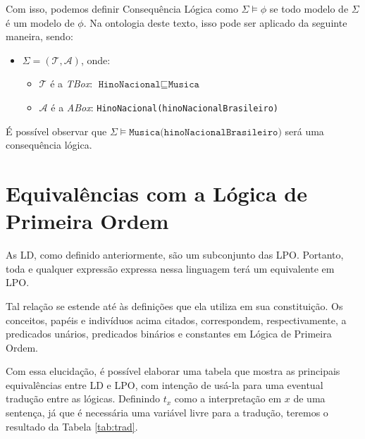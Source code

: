 Com isso, podemos definir Consequência Lógica como $ \Sigma \models \phi $ se todo modelo de $ \Sigma $ é um modelo de $ \phi $. Na ontologia deste texto, isso pode ser aplicado da seguinte maneira, sendo:

\begin{itemize}
	\item $ \Sigma = (\mathcal{T}, \mathcal{A}) $, onde:
	\begin{itemize}
		\item $ \mathcal{T} $ é a \textit{TBox}: $ \texttt{HinoNacional} \sqsubseteq \texttt{Musica} $
		\item $ \mathcal{A} $ é a \textit{ABox}: \texttt{HinoNacional(hinoNacionalBrasileiro)}
	\end{itemize}
\end{itemize}

É possível observar que $ \Sigma \models \texttt{Musica(hinoNacionalBrasileiro)} $ será uma consequência lógica.

\section{Equivalências com a Lógica de Primeira Ordem}

As LD, como definido anteriormente, são um subconjunto das LPO. Portanto, toda e qualquer expressão expressa nessa linguagem terá um equivalente em LPO. 

Tal relação se estende até às definições que ela utiliza em sua constituição. Os conceitos, papéis e indivíduos acima citados, correspondem, respectivamente, a predicados unários, predicados binários e constantes em Lógica de Primeira Ordem.

Com essa elucidação, é possível elaborar uma tabela que mostra as principais equivalências entre LD e LPO, com intenção de usá-la para uma eventual tradução entre as lógicas. Definindo $t_x$ como a interpretação em $x$ de uma sentença, já que é necessária uma variável livre para a tradução, teremos o resultado da Tabela \ref{tab:trad}.

